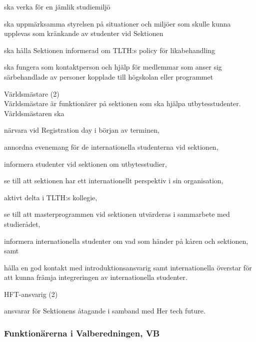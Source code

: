 \documentclass[10pt]{article}
\begin{document}
\begin{emptylist}
\begin{dashlist}
            \item ska verka för en jämlik studiemiljö
            \item ska uppmärksamma styrelsen på situationer och miljöer som skulle kunna upplevas som kränkande av studenter vid Sektionen
            \item ska hålla Sektionen informerad om TLTH:s policy för likabehandling
            \item ska fungera som kontaktperson och hjälp för medlemmar som anser sig särbehandlade av personer kopplade till högskolan eller programmet
        \end{dashlist}
    \item Världsmästare (2) \\
    	Världsmästare är funktionärer på sektionen som ska hjälpa utbytesstudenter. Världsmästaren ska
    	 \begin{dashlist}
    		\item närvara vid Registration day i början av terminen,
    		\item annordna evenemang för de internationella studenterna vid sektionen,
    		\item informera studenter vid sektionen om utbytesstudier,
    		\item se till att sektionen har ett internationellt perspektiv i sin organisation,
    		\item aktivt delta i TLTH:s kollegie,
    		\item se till att masterprogrammen vid sektionen utvärderas i sammarbete med studierådet,
    		\item informera internationella studenter om vad som händer på kåren och sektionen, samt
    		\item hålla en god kontakt med introduktionsansvarig samt internationella överstar för att kunna främja integreringen av internationella studenter.
        \end{dashlist}
    \item HFT-ansvarig (2)
        \begin{dashlist}
            \item ansvarar för Sektionens åtagande i samband med Her tech future.
        \end{dashlist}
\end{emptylist}
\subsubsection{Funktionärerna i Valberedningen, VB}
\end{document}
